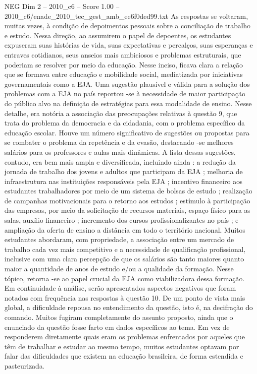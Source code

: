 \begin{textsample}{NEG Dim 2 – 2010\_c6 – Score 1.00 – 2010\_c6/enade\_2010\_tec\_gest\_amb\_ee6f0ded99.txt}
As respostas se voltaram, muitas vezes, à condição de depoimentos pessoais sobre a conciliação de trabalho e estudo.
Nessa direção, ao assumirem o papel de depoentes, os estudantes expuseram suas histórias de vida, suas expectativas e percalços, suas esperanças e entraves cotidianos, seus anseios mais ambiciosos e problemas estruturais, que poderiam se resolver por meio da educação.
Nesse inciso, ficava clara a relação que se formava entre educação e mobilidade social, mediatizada por iniciativas governamentais como a EJA.
Uma sugestão plausível e válida para a solução dos problemas com a EJA no país reportou -se à necessidade de maior participação do público alvo na definição de estratégias para essa modalidade de ensino.
Nesse detalhe, era notória a associação das preocupações relativas à questão 9, que trata do problema da democracia e da cidadania, com o problema específico da educação escolar.
Houve um número significativo de sugestões ou propostas para se combater o problema da repetência e da evasão, destacando -se melhores salários para os professores e aulas mais dinâmicas.
A lista dessas sugestões, contudo, era bem mais ampla e diversificada, incluindo ainda : a redução da jornada de trabalho dos jovens e adultos que participam da EJA ; melhoria de infraestrutura nas instituições responsáveis pela EJA ; incentivo financeiro aos estudantes trabalhadores por meio de um sistema de bolsas de estudo ; realização de campanhas motivacionais para o retorno aos estudos ; estímulo à participação das empresas, por meio da solicitação de recursos materiais, espaço físico para as salas, auxílio financeiro ; incremento dos cursos profissionalizantes no país ; e ampliação da oferta de ensino a distância em todo o território nacional.
Muitos estudantes abordaram, com propriedade, a associação entre um mercado de trabalho cada vez mais competitivo e a necessidade de qualificação profissional, inclusive com uma clara percepção de que os salários são tanto maiores quanto maior a quantidade de anos de estudo e/ou a qualidade da formação.
Nesse tópico, retorna -se ao papel crucial da EJA como viabilizadora dessa formação.
Em continuidade à análise, serão apresentados aspectos negativos que foram notados com frequência nas respostas à questão 10.
De um ponto de vista mais global, a dificuldade repousa no entendimento da questão, isto é, na decifração do comando.
Muitos fugiram completamente do assunto proposto, ainda que o enunciado da questão fosse farto em dados específicos ao tema.
Em vez de responderem diretamente quais eram os problemas enfrentados por aqueles que têm de trabalhar e estudar ao mesmo tempo, muitos estudantes optavam por falar das dificuldades que existem na educação brasileira, de forma estendida e pasteurizada.

\end{textsample}
